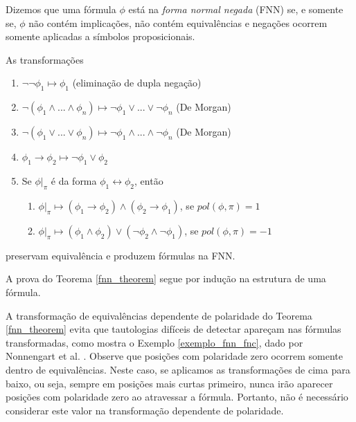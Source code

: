 \begin{definition}
    Dizemos que uma fórmula $\phi$ está na \emph{forma normal negada} (FNN) se, e somente se, $\phi$ não contém implicações, não contém equivalências e negações ocorrem somente aplicadas a símbolos proposicionais.
\end{definition}

\begin{theorem}
    \label{fnn_theorem}
    As transformações
    \begin{enumerate}
        \item $\neg \neg \phi_1 \longmapsto \phi_1$ (eliminação de dupla negação)
        \item $\neg(\phi_1 \wedge ... \wedge \phi_n) \longmapsto \neg \phi_1 \vee ... \vee \neg \phi_n$ (De Morgan)
        \item $\neg(\phi_1 \vee ... \vee \phi_n) \longmapsto \neg \phi_1 \wedge ... \wedge \neg \phi_n$ (De Morgan)
        \item $\phi_1 \rightarrow \phi_2 \longmapsto \neg \phi_1 \vee \phi_2$
        \item Se $\phi|_\pi$ é da forma $\phi_1 \leftrightarrow \phi_2$, então
        \begin{enumerate}
        	\item $\phi|_\pi \longmapsto (\phi_1 \rightarrow \phi_2) \wedge (\phi_2 \rightarrow \phi_1)$, se $pol(\phi,\pi) = 1$
        	\item $\phi|_\pi \longmapsto (\phi_1 \wedge \phi_2) \vee (\neg \phi_2 \wedge \neg \phi_1)$, se $pol(\phi,\pi) = -1$
        \end{enumerate}
    \end{enumerate}
    preservam equivalência e produzem fórmulas na FNN.
\end{theorem}

A prova do Teorema \ref{fnn_theorem} segue por indução na estrutura de uma fórmula.

A transformação de equivalências dependente de polaridade do Teorema \ref{fnn_theorem} evita que tautologias difíceis de detectar apareçam nas fórmulas transformadas, como mostra o Exemplo \ref{exemplo_fnn_fnc}, dado por Nonnengart et al. \cite{nonnengart2001computing}. Observe que posições com polaridade zero ocorrem somente dentro de equivalências. Neste caso, se aplicamos as transformações de cima para baixo, ou seja, sempre em posições mais curtas primeiro, nunca irão aparecer posições com polaridade zero ao atravessar a fórmula. Portanto, não é necessário considerar este valor na transformação dependente de polaridade.

